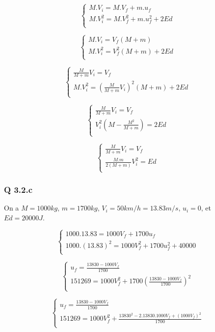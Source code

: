 \documentclass[]{book}
\theoremstyle{definition}
\begin{document}
$$
\left\{ 
\begin{array}{l}
 M.V_i =  M.V_f + m.u_f \\
 M.V_i^2  = M.V_f^2 + m.u_f^2 + 2Ed\\
\end{array}
\right. 
$$

$$
\left\{ 
\begin{array}{l}
 M.V_i =  V_f(M + m) \\
 M.V_i^2  = V_f^2(M + m) + 2Ed\\
\end{array}
\right. 
$$

$$
\left\{ 
\begin{array}{l}
 \frac{M}{M+m}V_i =  V_f \\
 M.V_i^2  = (\frac{M}{M+m}V_i)^2(M + m) + 2Ed\\
\end{array}
\right. 
$$

$$
\left\{ 
\begin{array}{l}
 \frac{M}{M+m}V_i =  V_f \\
 V_i^2(M -\frac{M^2}{M+m}) = 2Ed\\
\end{array}
\right. 
$$

$$
\left\{ 
\begin{array}{l}
 \frac{M}{M+m}V_i =  V_f \\
 \frac{M.m}{2(M+m)}V_i^2 = Ed\\
\end{array}
\right. 
$$


\subsubsection*{Q 3.2.c}
On a $M=1000kg$, $m=1700kg$, $V_i = 50km/h = 13.83m/s$, $u_i = 0$, et $Ed=20000J$.

$$
\left\{ 
\begin{array}{l}
 1000.13.83 = 1000V_f + 1700u_f \\
 1000.(13.83)^2  = 1000V_f^2 + 1700u_f^2 + 40000\\
\end{array}
\right. 
$$

$$
\left\{ 
\begin{array}{l}
 u_f = \frac{13830 - 1000V_f}{1700}\\
 151269  = 1000V_f^2 + 1700(\frac{13830- 1000V_f}{1700})^2\\
\end{array}
\right. 
$$

$$
\left\{ 
\begin{array}{l}
 u_f = \frac{13830 - 1000V_f}{1700}\\
 151269  = 1000V_f^2 + \frac{13830^2 - 2.13830.1000V_f + (1000V_f)^2}{1700}\\
\end{array}
\right. 
$$
\end{document}
